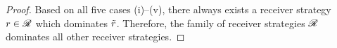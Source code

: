 \begin{proof}
%
%

\noindent Based on all five cases (i)--(v), there always exists a receiver strategy $r \in \mathscr{R}$ which dominates $\tilde{r}$. Therefore, the family of receiver strategies $\mathscr{R}$ dominates all other receiver strategies.
\end{proof}

